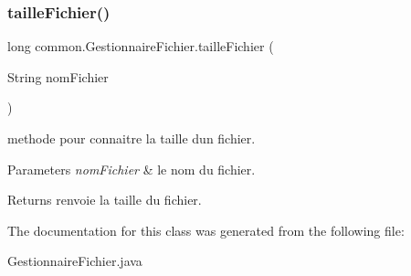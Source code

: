 \subsubsection{\texorpdfstring{taille\+Fichier()}{tailleFichier()}}
{\footnotesize\ttfamily long common.\+Gestionnaire\+Fichier.\+taille\+Fichier (\begin{DoxyParamCaption}\item[{String}]{nom\+Fichier }\end{DoxyParamCaption})\hspace{0.3cm}{\ttfamily [inline]}}



methode pour connaitre la taille d\textquotesingle{}un fichier. 


\begin{DoxyParams}{Parameters}
{\em nom\+Fichier} & le nom du fichier. \\
\hline
\end{DoxyParams}
\begin{DoxyReturn}{Returns}
renvoie la taille du fichier. 
\end{DoxyReturn}


The documentation for this class was generated from the following file\+:\begin{DoxyCompactItemize}
\item 
Gestionnaire\+Fichier.\+java\end{DoxyCompactItemize}
